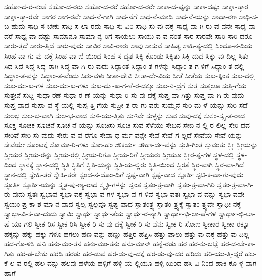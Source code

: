 {ಸಹೋ-ದ-ರ-ನಂತೆ
ಸಹೋ-ದ-ರರು
ಸಹೋ-ದ-ರರೆ
ಸಹೋ-ದ-ರರೇ
ಸಾಕಾ-ದ-ಷ್ಟನ್ನು
ಸಾಕಾ-ದಷ್ಟು
ಸಾಕ್ಷಾ-ತ್ಕಾರ
ಸಾಕ್ಷಾ-ತ್ಕಾ-ರವೇ
ಸಾಗರ
ಸಾಗ-ರವೇ
ಸಾಧ-ನೆ-ಗಾಗಿ
ಸಾಧ-ನೆಗೆ
ಸಾಧ-ನೆ-ಮಾಡಿ
ಸಾಧ-ನೆ-ಯನ್ನು
ಸಾಧಾ-ರಣ
ಸಾಧಿ-ಸ-ಬ-ಹುದು
ಸಾಧಿ-ಸ-ಬೇಕು
ಸಾಧಿ-ಸ-ಲಾ-ರದು
ಸಾಧಿ-ಸು-ವಿರಿ
ಸಾಧಿ-ಸು-ವು-ದಕ್ಕೆ
ಸಾಧ್ಯ-ವಾ-ಗಿ-ರು-ವ-ವನೇ
ಸಾಧ್ಯ-ವಾ-ದರೆ
ಸಾಧ್ಯ-ವಾ-ದಷ್ಟು
ಸಾಮಾನೂ
ಸಾಮಾ-ನ್ಯ-ರಿಗೆ
ಸಾಯಲು
ಸಾಯು-ವ-ವ-ನಂತೆ
ಸಾರ
ಸಾರವೇ
ಸಾರಿ
ಸಾರಿ-ದರೂ
ಸಾರು-ತ್ತದೆ
ಸಾರು-ತ್ತಿದೆ
ಸಾರು-ವುದು
ಸಾವಿರ
ಸಾವಿ-ರಾರು
ಸಾವು
ಸಾಸುವೆ
ಸಾಹಿತ್ಯ
ಸಾಹಿ-ತ್ಯ-ದಲ್ಲಿ
ಸಿಂಧೂ-ನ-ದಿಯ
ಸಿಂಹ-ವಾ-ಗು-ವು-ದಕ್ಕೆ
ಸಿಂಹ-ವಾ-ಣಿ-ಯಿಂದ
ಸಿಂಹ-ಸ-ದೃಶ
ಸಿಕ್ಕಿ-ಕೊಂಡು
ಸಿಕ್ಕಿತು
ಸಿಕ್ಕಿ-ದುದ
ಸಿಕ್ಕು-ವು-ದಿಲ್ಲ
ಸಿತು
ಸಿದ
ಸಿದೆ
ಸಿದ್ಧ
ಸಿದ್ಧ-ರಾಗಿ
ಸಿದ್ಧ-ವಾ-ಗಿ-ರು-ವುದು
ಸಿದ್ಧಾಂತ
ಸಿದ್ಧಾಂ-ತ-ಗಳನ್ನು
ಸಿದ್ಧಾಂ-ತ-ಗ-ಳಿಗೆ
ಸಿದ್ಧಾಂ-ತ-ದಲ್ಲಿ
ಸಿದ್ಧಾಂ-ತ-ವನ್ನು
ಸಿದ್ಧಾಂ-ತ-ವೆಂದು
ಸಿರು-ವಳು
ಸೀತಾ-ದೇವಿ
ಸೀತಾ-ದೇ-ವಿಯ
ಸೀತೆ
ಸೀತೆಯ
ಸುಖ-ಕ್ಕಿಂತ
ಸುಖ-ದಲ್ಲಿ
ಸುಖ-ದುಃ-ಖ-ಗಳ
ಸುಖ-ದುಃ-ಖ-ಗಳು
ಸುಖ-ದುಃ-ಖ-ಗ-ಳೆ-ರ-ಡಕ್ಕೂ
ಸುಖ-ನಿ-ದ್ರೆಗೆ
ಸುತ್ತ
ಸುತ್ತಲೂ
ಸುತ್ತಿ-ಗೆಯ
ಸುತ್ತೇನೆ
ಸುದ್ದಿ
ಸುಧಾ-ರಣೆ
ಸುಧಾ-ರ-ಣೆ-ಯನ್ನು
ಸುಧಾ-ರಿ-ಸು-ವು-ದಕ್ಕೆ
ಸುಪ್ತ-ವಾ-ಗಿತ್ತು
ಸುಪ್ತ-ವಾ-ಗಿ-ರು-ವುದು
ಸುಪ್ತ-ವಾದ
ಸುಪ್ತಾ-ವ-ಸ್ಥೆ-ಯಲ್ಲಿ
ಸುಪ್ಪ-ತ್ತಿ-ಗೆಯ
ಸುಪ್ರೀ-ತ-ರಾ-ಗು-ವರು
ಸುಮ್ಮನೆ
ಸುರಿ-ಮ-ಳೆ-ಯನ್ನು
ಸುರಿ-ಸದೆ
ಸುಲಭ
ಸುಲ-ಭ-ವಾಗಿ
ಸುಲ-ಭ-ವಾದ
ಸುಳಿ-ಯು-ತ್ತಿತ್ತು
ಸುಳಿವೇ
ಸುಳ್ಳನ್ನು
ಸುವ
ಸುವು-ದಕ್ಕೆ
ಸುಸಂ-ಸ್ಕೃ-ತ-ರಾದ
ಸೂಕ್ತ
ಸೂಚಕ
ಸೂಚನೆ
ಸೂಚ-ನೆ-ಯನ್ನು
ಸೂಚಿಸು
ಸೂಚಿ-ಸುವ
ಸೆಳೆಯು
ಸೇಬಿನ
ಸೇಬಿ-ನ-ಲ್ಲಿ-ರ-ಲಿಲ್ಲ
ಸೇರಿ-ದವ
ಸೇರಿವೆ
ಸೇರಿ-ಸು-ವುದು
ಸೇರು-ವ-ವ-ರೆಗೂ
ಸೇವಾ-ಧ-ರ್ಮ-ವನ್ನೇ
ಸೇವೆ
ಸೇವೆ-ಗ-ಲ್ಲದೆ
ಸೇವೆಯ
ಸೇವೆ-ಯನ್ನು
ಸೇವೆಯೇ
ಸೊಂಟಕ್ಕೆ
ಸೋಮಾ-ರಿ-ಗಳು
ಸೋಽಹಂ
ಸೌಕರ್ಯ
ಸೌಹಾ-ರ್ದ-ವನ್ನು
ಸ್ತುತಿ-ಗಿಂತ
ಸ್ತುವಂತು
ಸ್ತ್ರೀ
ಸ್ತ್ರೀಯನ್ನು
ಸ್ತ್ರೀಯರ
ಸ್ತ್ರೀಯ-ರನ್ನು
ಸ್ತ್ರೀಯ-ರಲ್ಲಿ
ಸ್ತ್ರೀಯ-ರಿಗೂ
ಸ್ತ್ರೀಯ-ರಿಗೆ
ಸ್ತ್ರೀಯರು
ಸ್ತ್ರೀಯೂ
ಸ್ತ್ರೀರ-ತ್ನ-ಗಳ
ಸ್ಥಳ-ದಲ್ಲಿ
ಸ್ಥಳ-ದಿಂದ
ಸ್ಥಾನಕ್ಕೆ
ಸ್ಥಾನ-ದಲ್ಲಿ
ಸ್ಥಿತಿ
ಸ್ಥಿತಿಗೆ
ಸ್ಥಿತಿ-ಯನ್ನು
ಸ್ಥಿತಿ-ಯ-ಲ್ಲಿರು
ಸ್ಥಿತಿ-ಯಿಂದ
ಸ್ಥಿರತೆ
ಸ್ಥಿರ-ವಾಗಿ
ಸ್ಥಿರ-ವಾ-ಗಿದೆ
ಸ್ಧಾನ-ದಲ್ಲಿ
ಸ್ನೇಹಿ-ತರೆ
ಸ್ನೇಹಿ-ತರೇ
ಸ್ಪಂದ-ನ-ದೊಂ-ದಿಗೆ
ಸ್ಪಷ್ಟ-ವಾಗಿ
ಸ್ಪಷ್ಟ-ವಾದ
ಸ್ಪೂರ್ತಿ
ಸ್ಫಟಿ-ಕ-ವಾ-ಗು-ವುದು
ಸ್ಫೂರ್ತಿ
ಸ್ಫೂರ್ತಿ-ಯನ್ನು
ಸ್ಮೃತ-ಪು-ಣ್ಯ-ರಾದ
ಸ್ಮೃತಿ-ಗಳನ್ನು
ಸ್ವಂತ
ಸ್ವತಂ-ತ್ರ-ವಾಗಿ
ಸ್ವತಂ-ತ್ರ-ವಾ-ಗಿರಿ
ಸ್ವತಂ-ತ್ರ-ವಾ-ಗಿ-ರು-ವುದು
ಸ್ವತಃ
ಸ್ವಭಾವ
ಸ್ವಭಾ-ವಕ್ಕೆ
ಸ್ವಭಾ-ವ-ಗಳ
ಸ್ವಭಾ-ವ-ಗ-ಳಿವೆ
ಸ್ವಭಾ-ವತಃ
ಸ್ವಭಾ-ವ-ವನ್ನು
ಸ್ವಭಾ-ವವೇ
ಸ್ವಯಂ-ಪ್ರ-ಕಾ-ಶ-ಮಾ-ನ-ವಾದ
ಸ್ವಲ್ಪ
ಸ್ವಲ್ಪವೂ
ಸ್ವಷ್ಟ-ವಾದ
ಸ್ವಾತಂತ್ರ್ಯ
ಸ್ವಾತಂ-ತ್ರ್ಯಕ್ಕೆ
ಸ್ವಾತಂ-ತ್ರ್ಯವೇ
ಸ್ವಾಧೀ-ನಕ್ಕೆ
ಸ್ವಾಭಾ-ವಿ-ಕ-ವಾ-ದುದು
ಸ್ವಾಮಿ
ಸ್ವಾರ್ಥ
ಸ್ವಾರ್ಥ-ತೆಯ
ಸ್ವಾರ್ಥ-ರ-ನ್ನಾಗಿ
ಸ್ವಾರ್ಥಾ-ಭಿ-ಲಾ-ಷೆ-ಗಳ
ಸ್ವಾರ್ಥಾ-ಭಿ-ಲಾ-ಷೆ-ಯಾ-ಗಲಿ
ಸ್ವೀಕ-ರಿಸ
ಸ್ವೀಕ-ರಿಸಿ
ಸ್ವೀಕ-ರಿ-ಸು-ವು-ದಕ್ಕೆ
ಸ್ವೀಕ-ರಿ-ಸು-ವೆನು
ಸ್ವೀಕ-ರಿ-ಸೋಣ
ಸ್ವೀಕಾರ
ಸ್ವೀಕಾ-ರಕ್ಕೂ
ಹಕ್ಕನ್ನು
ಹಕ್ಕು
ಹಕ್ಕು-ಗಳೂ
ಹಗಲು
ಹಣ-ವನ್ನು
ಹಣ್ಣು
ಹತ್ತಿರ
ಹತ್ತಿಸಿ
ಹತ್ತು-ಪಾಲು
ಹತ್ತು-ವು-ದಕ್ಕೆ
ಹತ್ತು-ವು-ದಿಲ್ಲ
ಹದ-ಗೊ-ಳಿಸಿ
ಹನಿ
ಹನು-ಮಂ-ತನ
ಹನು-ಮಂ-ತನು
ಹನು-ಮಾನ್
ಹನ್ನೆ-ರಡು
ಹರ
ಹರ-ಕು-ಬಟ್ಟೆ
ಹರ-ಡ-ಬೇ-ಕಾ-ಗಿತ್ತು
ಹರ-ಡ-ಬೇಕು
ಹರಡಿ
ಹರಡು
ಹರ-ಡುವ
ಹರ-ಡು-ವು-ದಕ್ಕೆ
ಹರ-ಡು-ವು-ದರ
ಹರಿದು
ಹರಿ-ಯು-ತ್ತಿ-ದ್ದರೆ
ಹಲ-ಕೆ-ಲ-ವ-ರಲ್ಲಿ
ಹಲ-ವನ್ನು
ಹಲವು
ಹಳೆಯ
ಹಳ್ಳಿಗೆ
ಹಳ್ಳಿ-ಯ-ಲ್ಲಿಯೂ
ಹಳ್ಳಿ-ಯಿಂದ
ಹಸಿ-ವಿ-ನಿಂದ
ಹಾಕಿ-ಕೊ-ಳ್ಳ-ವಾಗ
ಹಾಗೆ
}
